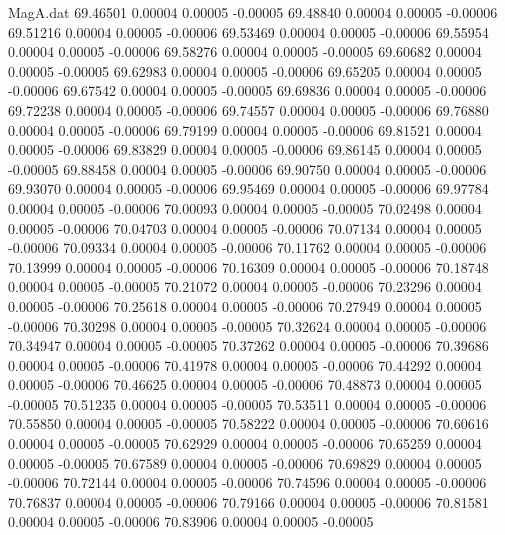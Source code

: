 \begin{filecontents}{MagA.dat}
  69.46501    0.00004    0.00005   -0.00005
  69.48840    0.00004    0.00005   -0.00006
  69.51216    0.00004    0.00005   -0.00006
  69.53469    0.00004    0.00005   -0.00006
  69.55954    0.00004    0.00005   -0.00006
  69.58276    0.00004    0.00005   -0.00005
  69.60682    0.00004    0.00005   -0.00005
  69.62983    0.00004    0.00005   -0.00006
  69.65205    0.00004    0.00005   -0.00006
  69.67542    0.00004    0.00005   -0.00005
  69.69836    0.00004    0.00005   -0.00006
  69.72238    0.00004    0.00005   -0.00006
  69.74557    0.00004    0.00005   -0.00006
  69.76880    0.00004    0.00005   -0.00006
  69.79199    0.00004    0.00005   -0.00006
  69.81521    0.00004    0.00005   -0.00006
  69.83829    0.00004    0.00005   -0.00006
  69.86145    0.00004    0.00005   -0.00005
  69.88458    0.00004    0.00005   -0.00006
  69.90750    0.00004    0.00005   -0.00006
  69.93070    0.00004    0.00005   -0.00006
  69.95469    0.00004    0.00005   -0.00006
  69.97784    0.00004    0.00005   -0.00006
  70.00093    0.00004    0.00005   -0.00005
  70.02498    0.00004    0.00005   -0.00006
  70.04703    0.00004    0.00005   -0.00006
  70.07134    0.00004    0.00005   -0.00006
  70.09334    0.00004    0.00005   -0.00006
  70.11762    0.00004    0.00005   -0.00006
  70.13999    0.00004    0.00005   -0.00006
  70.16309    0.00004    0.00005   -0.00006
  70.18748    0.00004    0.00005   -0.00005
  70.21072    0.00004    0.00005   -0.00006
  70.23296    0.00004    0.00005   -0.00006
  70.25618    0.00004    0.00005   -0.00006
  70.27949    0.00004    0.00005   -0.00006
  70.30298    0.00004    0.00005   -0.00005
  70.32624    0.00004    0.00005   -0.00006
  70.34947    0.00004    0.00005   -0.00005
  70.37262    0.00004    0.00005   -0.00006
  70.39686    0.00004    0.00005   -0.00006
  70.41978    0.00004    0.00005   -0.00006
  70.44292    0.00004    0.00005   -0.00006
  70.46625    0.00004    0.00005   -0.00006
  70.48873    0.00004    0.00005   -0.00005
  70.51235    0.00004    0.00005   -0.00005
  70.53511    0.00004    0.00005   -0.00006
  70.55850    0.00004    0.00005   -0.00005
  70.58222    0.00004    0.00005   -0.00006
  70.60616    0.00004    0.00005   -0.00005
  70.62929    0.00004    0.00005   -0.00006
  70.65259    0.00004    0.00005   -0.00005
  70.67589    0.00004    0.00005   -0.00006
  70.69829    0.00004    0.00005   -0.00006
  70.72144    0.00004    0.00005   -0.00006
  70.74596    0.00004    0.00005   -0.00006
  70.76837    0.00004    0.00005   -0.00006
  70.79166    0.00004    0.00005   -0.00006
  70.81581    0.00004    0.00005   -0.00006
  70.83906    0.00004    0.00005   -0.00005

\end{filecontents}
